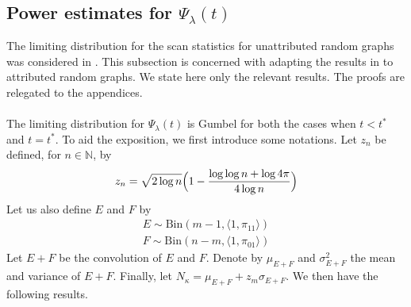 \documentclass[final]{IEEEtran}
\theoremstyle{definition}
\begin{document}
\subsection{Power estimates for $\Psi_{\lambda}(t)$}
\label{sec:power-estim-psi_l}
The limiting distribution for the scan statistics for unattributed
random graphs was considered in
\cite{rukhin:_limit_distr_graph_scan_statis}. This subsection is
concerned with adapting the results in
\cite{rukhin:_limit_distr_graph_scan_statis} to attributed random
graphs. We state here only the relevant results. The proofs are
relegated to the appendices. \\ \\
\noindent
The limiting distribution for $\Psi_{\lambda}(t)$ is Gumbel for both
the cases when $t < t^{*}$ and $t = t^{*}$. To aid the exposition,
 we first introduce some notations. Let $z_n$ be defined, for $n \in \mathbb{N}$, by
\begin{equation}
  \label{eq:20}
   z_n = \sqrt{2
      \log{n}}\Bigl(1 - \frac{\log{\log{n}} + \log{4 \pi}}{4
      \log{n}}\Bigr)
\end{equation}
Let us also define $E$ and $F$ by
\begin{gather*}
  E \sim \mathrm{Bin}(m-1, \langle 1, \pi_{11} \rangle) \\ F \sim \mathrm{Bin}(n-m,
  \langle 1, \pi_{01} \rangle)
\end{gather*}%
Let $E + F$ be the convolution of $E$ and $F$. Denote by $\mu_{E+F}$ and
$\sigma_{E+F}^{2}$ the mean and variance of $E + F$. Finally, let
$N_{\kappa} = \mu_{E + F} + z_m \sigma_{E + F}$. We then have the
following results.
\end{document}
